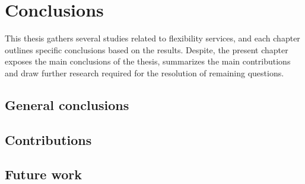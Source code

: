 
    \chapter{Conclusions}
    \label{conclus}
    This thesis gathers several studies related to flexibility services, and each chapter outlines specific conclusions based on the results. Despite, the present chapter exposes the main conclusions of the thesis, summarizes the main contributions and draw further research required for the resolution of remaining questions. 

    \section{General conclusions}
	
    
     
    \section{Contributions}
	
	

    \section{Future work}
    
